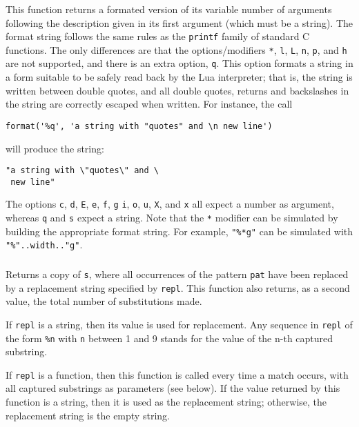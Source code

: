 \subsubsection*{}
\label{format}
This function returns a formated version of its variable number of arguments
following the description given in its first argument (which must be a string).
The format string follows the same rules as the \verb'printf' family of
standard C functions.
The only differences are that the options/modifiers
\verb'*', \verb'l', \verb'L', \verb'n', \verb'p',
and \verb'h' are not supported,
and there is an extra option, \verb'q'.
This option formats a string in a form suitable to be safely read
back by the Lua interpreter;
that is,
the string is written between double quotes,
and all double quotes, returns and backslashes in the string
are correctly escaped when written.
For instance, the call
\begin{verbatim}
format('%q', 'a string with "quotes" and \n new line')
\end{verbatim}
will produce the string:
\begin{verbatim}
"a string with \"quotes\" and \
 new line"
\end{verbatim}

The options \verb'c', \verb'd', \verb'E', \verb'e', \verb'f',
\verb'g' \verb'i', \verb'o', \verb'u', \verb'X', and \verb'x' all
expect a number as argument,
whereas \verb'q' and \verb's' expect a string.
Note that the \verb'*' modifier can be simulated by building
the appropriate format string.
For example, \verb|"%*g"| can be simulated with
\verb|"%"..width.."g"|.

\subsubsection*{}
Returns a copy of \verb-s-,
where all occurrences of the pattern \verb-pat- have been
replaced by a replacement string specified by \verb-repl-.
This function also returns, as a second value,
the total number of substitutions made.

If \verb-repl- is a string, then its value is used for replacement.
Any sequence in \verb-repl- of the form \verb-%n-
with \verb-n- between 1 and 9
stands for the value of the n-th captured substring.

If \verb-repl- is a function, then this function is called every time a
match occurs, with all captured substrings as parameters
(see below).
If the value returned by this function is a string,
then it is used as the replacement string;
otherwise, the replacement string is the empty string.

